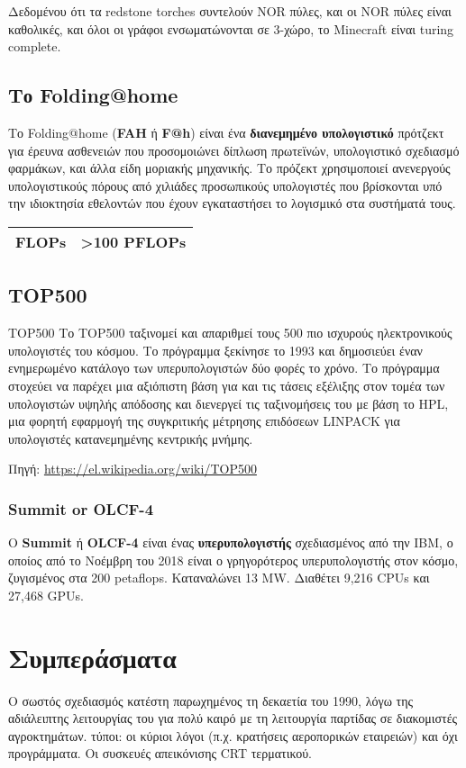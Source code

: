 \documentclass[11pt,a4paper,notitlepage,fleqn]{article}
\begin{document}
Δεδομένου ότι τα redstone torches συντελούν NOR πύλες, και οι NOR πύλες είναι καθολικές, και όλοι οι γράφοι ενσωματώνονται σε 3-χώρο, το Minecraft είναι turing complete. \qedsymbol

\subsection{Το Folding@home}

Το Folding@home (\textbf{FAH} ή \textbf{F@h}) είναι ένα \textbf{διανεμημένο υπολογιστικό} πρότζεκτ για έρευνα ασθενειών που προσομοιώνει δίπλωση πρωτεϊνών, υπολογιστικό σχεδιασμό φαρμάκων, και άλλα είδη μοριακής μηχανικής. Το πρόζεκτ χρησιμοποιεί ανενεργούς υπολογιστικούς πόρους από χιλιάδες προσωπικούς υπολογιστές που βρίσκονται υπό την ιδιοκτησία εθελοντών που έχουν εγκαταστήσει το λογισμικό στα συστήματά τους.

\begin{tabular}{|l|l|}
	\hline FLOPs & >100 PFLOPs \\ \hline
\end{tabular}

\subsection{TOP500}

\begin{defn}{TOP500}{}
	Το TOP500 ταξινομεί και απαριθμεί τους 500 πιο ισχυρούς ηλεκτρονικούς υπολογιστές του κόσμου. Το πρόγραμμα ξεκίνησε το 1993 και δημοσιεύει έναν ενημερωμένο κατάλογο των υπερυπολογιστών δύο φορές το χρόνο. Το πρόγραμμα στοχεύει να παρέχει μια αξιόπιστη βάση για και τις τάσεις εξέλιξης στον τομέα των υπολογιστών υψηλής απόδοσης και διενεργεί τις ταξινομήσεις του με βάση το HPL, μια φορητή εφαρμογή της συγκριτικής μέτρησης επιδόσεων LINPACK για υπολογιστές κατανεμημένης κεντρικής μνήμης. 
\end{defn}
{\footnotesize Πηγή: \url{https://el.wikipedia.org/wiki/TOP500}}


\subsubsection{Summit or OLCF-4}
Ο \textbf{Summit} ή \textbf{OLCF-4} είναι ένας \textbf{υπερυπολογιστής} σχεδιασμένος από την IBM, ο οποίος από το Νοέμβρη του 2018 είναι ο γρηγορότερος υπερυπολογιστής στον κόσμο, ζυγισμένος στα 200 petaflops. Καταναλώνει 13 MW. Διαθέτει 9,216 CPUs και 27,468 GPUs.

\section{Συμπεράσματα}
Ο σωστός σχεδιασμός κατέστη παρωχημένος τη δεκαετία του 1990, λόγω της αδιάλειπτης λειτουργίας του για πολύ καιρό με τη λειτουργία παρτίδας σε διακομιστές αγροκτημάτων. τύποι: οι κύριοι λόγοι (π.χ. κρατήσεις αεροπορικών εταιρειών) και όχι προγράμματα. Οι συσκευές απεικόνισης CRT τερματικού.
\end{document}
